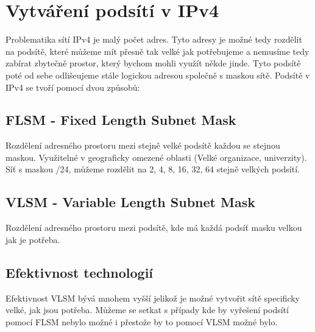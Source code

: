 \section{Vytváření podsítí v IPv4}
\label{sec:podsite-ipv4}
Problematika sítí IPv4 je malý počet adres.
Tyto adresy je možné tedy rozdělit na podsítě, které můžeme mít přesně tak velké jak potřebujeme a nemusíme tedy zabírat zbytečně prostor, který bychom mohli využít někde jinde.
Tyto podsítě poté od sebe odlišeujeme stále logickou adresou společně s maskou sítě.
Podsítě v IPv4 se tvoří pomocí dvou způsobů:
\subsection{FLSM - Fixed Length Subnet Mask}
Rozdělení adresného prostoru mezi stejně velké podsítě každou se stejnou maskou.
Využitelné v geograficky omezené oblasti (Velké organizace, univerzity).
Síť s maskou /24, můžeme rozdělit na 2, 4, 8, 16, 32, 64 stejně velkých podsítí.
\subsection{VLSM - Variable Length Subnet Mask}
Rozdělení adresného prostoru mezi podsítě, kde má každá podsíť masku velkou jak je potřeba.
\subsection{Efektivnost technologií}
Efektivnost VLSM bývá mnohem vyšší jelikož je možné vytvořit sítě specificky velké, jak jsou potřeba.
Můžeme se setkat s případy kde by vyřešení podsítí pomocí FLSM nebylo možné i přestože by to pomocí VLSM možné bylo. \\
